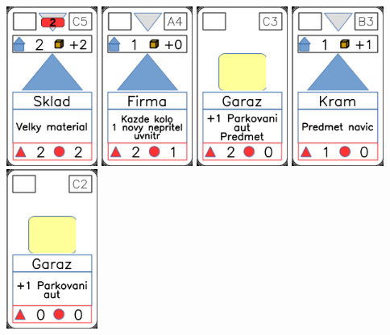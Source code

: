 \documentclass[a4paper]{article}
\begin{document}
	\includegraphics[width=3.0cm]{img-3_14}
	\includegraphics[width=3.0cm]{img-3_18}
	\includegraphics[width=3.0cm]{img-2_12}
	\includegraphics[width=3.0cm]{img-3_7}
	\includegraphics[width=3.0cm]{img-2_11}
\end{document}
